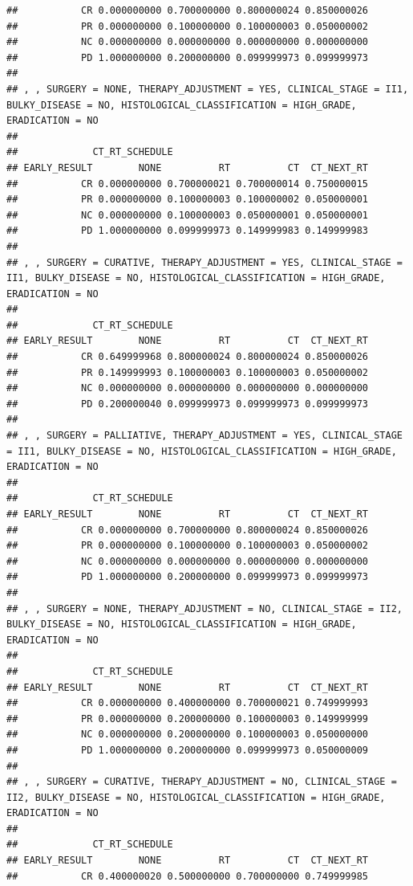 \documentclass[]{article}
\begin{document}
\begin{verbatim}
##           CR 0.000000000 0.700000000 0.800000024 0.850000026
##           PR 0.000000000 0.100000000 0.100000003 0.050000002
##           NC 0.000000000 0.000000000 0.000000000 0.000000000
##           PD 1.000000000 0.200000000 0.099999973 0.099999973
## 
## , , SURGERY = NONE, THERAPY_ADJUSTMENT = YES, CLINICAL_STAGE = II1, BULKY_DISEASE = NO, HISTOLOGICAL_CLASSIFICATION = HIGH_GRADE, ERADICATION = NO
## 
##             CT_RT_SCHEDULE
## EARLY_RESULT        NONE          RT          CT  CT_NEXT_RT
##           CR 0.000000000 0.700000021 0.700000014 0.750000015
##           PR 0.000000000 0.100000003 0.100000002 0.050000001
##           NC 0.000000000 0.100000003 0.050000001 0.050000001
##           PD 1.000000000 0.099999973 0.149999983 0.149999983
## 
## , , SURGERY = CURATIVE, THERAPY_ADJUSTMENT = YES, CLINICAL_STAGE = II1, BULKY_DISEASE = NO, HISTOLOGICAL_CLASSIFICATION = HIGH_GRADE, ERADICATION = NO
## 
##             CT_RT_SCHEDULE
## EARLY_RESULT        NONE          RT          CT  CT_NEXT_RT
##           CR 0.649999968 0.800000024 0.800000024 0.850000026
##           PR 0.149999993 0.100000003 0.100000003 0.050000002
##           NC 0.000000000 0.000000000 0.000000000 0.000000000
##           PD 0.200000040 0.099999973 0.099999973 0.099999973
## 
## , , SURGERY = PALLIATIVE, THERAPY_ADJUSTMENT = YES, CLINICAL_STAGE = II1, BULKY_DISEASE = NO, HISTOLOGICAL_CLASSIFICATION = HIGH_GRADE, ERADICATION = NO
## 
##             CT_RT_SCHEDULE
## EARLY_RESULT        NONE          RT          CT  CT_NEXT_RT
##           CR 0.000000000 0.700000000 0.800000024 0.850000026
##           PR 0.000000000 0.100000000 0.100000003 0.050000002
##           NC 0.000000000 0.000000000 0.000000000 0.000000000
##           PD 1.000000000 0.200000000 0.099999973 0.099999973
## 
## , , SURGERY = NONE, THERAPY_ADJUSTMENT = NO, CLINICAL_STAGE = II2, BULKY_DISEASE = NO, HISTOLOGICAL_CLASSIFICATION = HIGH_GRADE, ERADICATION = NO
## 
##             CT_RT_SCHEDULE
## EARLY_RESULT        NONE          RT          CT  CT_NEXT_RT
##           CR 0.000000000 0.400000000 0.700000021 0.749999993
##           PR 0.000000000 0.200000000 0.100000003 0.149999999
##           NC 0.000000000 0.200000000 0.100000003 0.050000000
##           PD 1.000000000 0.200000000 0.099999973 0.050000009
## 
## , , SURGERY = CURATIVE, THERAPY_ADJUSTMENT = NO, CLINICAL_STAGE = II2, BULKY_DISEASE = NO, HISTOLOGICAL_CLASSIFICATION = HIGH_GRADE, ERADICATION = NO
## 
##             CT_RT_SCHEDULE
## EARLY_RESULT        NONE          RT          CT  CT_NEXT_RT
##           CR 0.400000020 0.500000000 0.700000000 0.749999985

\end{verbatim}
\end{document}
